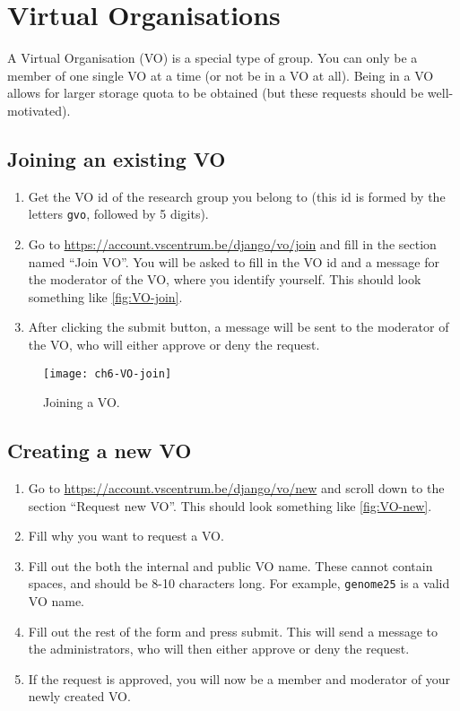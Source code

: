 \ifgent
\section{Virtual Organisations}
\label{sec:virtual-organisations}
\hypertarget{sec:virtual-organisation}{}

A Virtual Organisation (VO) is a special type of group. You can only be a member
of one single VO at a time (or not be in a VO at all).
Being in a VO allows for larger storage quota to be obtained
(but these requests should be well-motivated).

\subsection{Joining an existing VO}

\begin{enumerate}
    \item Get the VO id of the research group you belong to (this id is formed by
        the letters \lstinline|gvo|, followed by 5 digits).
    \item Go to \url{https://account.vscentrum.be/django/vo/join} and fill in the
        section named ``Join VO''. You will be asked to fill in the VO id and a message for
        the moderator of the VO, where you identify yourself. This should look something
        like \autoref{fig:VO-join}.
    \item After clicking the submit button, a message will be sent to the moderator
    of the VO, who will either approve or deny the request.
\end{enumerate}



\begin{figure}[!htbp]
  \caption{Joining a VO.}
  \centering
    \texttt{[image: ch6-VO-join]}
\end{figure}\label{fig:VO-join}

\subsection{Creating a new VO}

\begin{enumerate}
    \item Go to \url{https://account.vscentrum.be/django/vo/new} and scroll down
        to the section ``Request new VO''. This should look something like
        \autoref{fig:VO-new}.
    \item Fill why you want to request a VO.
    \item Fill out the both the internal and public VO name. These cannot contain
        spaces, and should be 8-10 characters long. For example, \lstinline|genome25| is
        a valid VO name.
    \item Fill out the rest of the form and press submit. This will send a message
        to the \hpc administrators, who will then either approve or deny the request.
    \item If the request is approved, you will now be a member and moderator of your
        newly created VO.
\end{enumerate}


